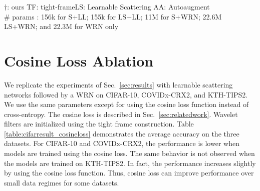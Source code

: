 \documentclass[10pt,twocolumn,letterpaper]{article}
\begin{document}
\begin{table}[H]
\begin{tabularx}{340pt}{lllllll}
    \end{tabularx}
\begin{flushleft}
\scriptsize
\vspace{-5pt}
\hspace{85pt}$\dagger$: ours \hspace{5pt} TF: tight-frame\hspace{5pt}LS: Learnable Scattering\hspace{5pt} AA: Autoaugment\hspace{5pt}\\
\hspace{85pt}$\#$ params : 156k for S+LL; 155k for LS+LL; 11M for S+WRN; 22.6M LS+WRN; and 22.3M for WRN only\\
\end{flushleft}
\end{table}

\section{Cosine Loss Ablation}
\label{appendix-cosine-loss}
We replicate the experiments of Sec.~\ref{sec:results} with learnable scattering networks followed by a WRN on CIFAR-10, COVIDx-CRX2, and KTH-TIPS2. We use the same parameters except for using the cosine loss function \cite{barz2020deep} instead of cross-entropy. The cosine loss is described in Sec.~\ref{sec:relatedwork}. Wavelet filters are initialized using the tight frame construction. Table \ref{table:cifarresult_cosineloss} demonstrates the average accuracy on the three datasets. For CIFAR-10 and COVIDx-CRX2, the performance is lower when models are trained using the cosine loss. The same behavior is not observed when the models are trained on KTH-TIPS2. In fact, the performance increases slightly by using the cosine loss function. Thus, cosine loss can improve performance over small data regimes for some datasets.
\end{document}
